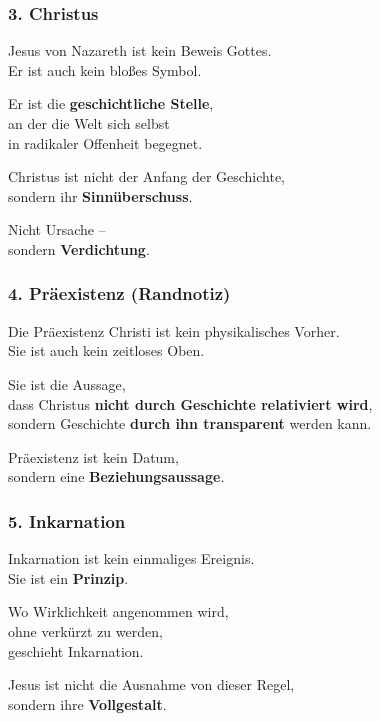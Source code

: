 \documentclass[
]{article}
\begin{document}
\subsubsection{\texorpdfstring{\textbf{3. Christus}}{3. Christus}}\label{christus}

Jesus von Nazareth ist kein Beweis Gottes.\\
Er ist auch kein bloßes Symbol.

Er ist die \textbf{geschichtliche Stelle},\\
an der die Welt sich selbst\\
in radikaler Offenheit begegnet.

Christus ist nicht der Anfang der Geschichte,\\
sondern ihr \textbf{Sinnüberschuss}.

Nicht Ursache --\\
sondern \textbf{Verdichtung}.

\subsubsection{\texorpdfstring{\textbf{4. Präexistenz (Randnotiz)}}{4. Präexistenz (Randnotiz)}}\label{pruxe4existenz-randnotiz}

Die Präexistenz Christi ist kein physikalisches Vorher.\\
Sie ist auch kein zeitloses Oben.

Sie ist die Aussage,\\
dass Christus \textbf{nicht durch Geschichte relativiert wird},\\
sondern Geschichte \textbf{durch ihn transparent} werden kann.

Präexistenz ist kein Datum,\\
sondern eine \textbf{Beziehungsaussage}.

\subsubsection{\texorpdfstring{\textbf{5. Inkarnation}}{5. Inkarnation}}\label{inkarnation}

Inkarnation ist kein einmaliges Ereignis.\\
Sie ist ein \textbf{Prinzip}.

Wo Wirklichkeit angenommen wird,\\
ohne verkürzt zu werden,\\
geschieht Inkarnation.

Jesus ist nicht die Ausnahme von dieser Regel,\\
sondern ihre \textbf{Vollgestalt}.
\end{document}
